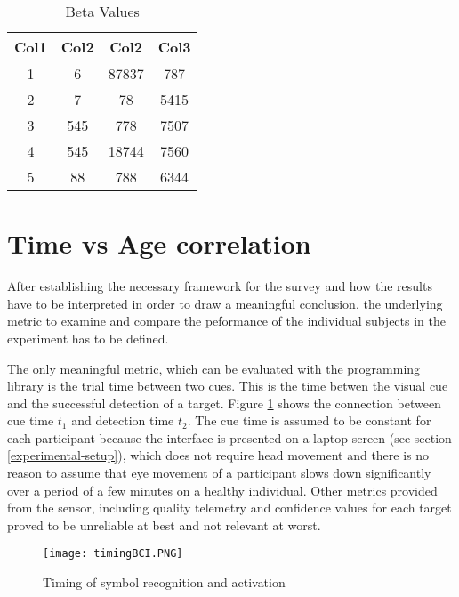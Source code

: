             \begin{table}[h!]
                \centering
                \begin{tabular}{||c c c c||} 
                 \hline
                 Col1 & Col2 & Col2 & Col3 \\ [0.5ex] 
                 \hline\hline
                 1 & 6 & 87837 & 787 \\ 
                 2 & 7 & 78 & 5415 \\
                 3 & 545 & 778 & 7507 \\
                 4 & 545 & 18744 & 7560 \\
                 5 & 88 & 788 & 6344 \\ [1ex] 
                 \hline
                \end{tabular}
                \caption{Beta Values}
                \label{beta}
            \end{table} 
                 
        \section{Time vs Age correlation}\label{correlation}

            After establishing the necessary framework for the survey and how the results have to be interpreted in order to draw a meaningful conclusion, the underlying metric to examine and compare the peformance of the individual subjects in the experiment has to be defined. 

            The only meaningful metric, which can be evaluated with the programming library is the trial time between two cues. This is the time betwen the visual cue and the successful detection of a target. Figure \ref*{itr-timing} shows the connection between cue time $t_{1}$ and detection time $t_{2}$. The cue time is assumed to be constant for each participant because the interface is presented on a laptop screen (see section \ref*{experimental-setup}), which does not require head movement and there is no reason to assume that eye movement of a participant slows down significantly over a period of a few minutes on a healthy individual. Other metrics provided from the sensor, including quality telemetry and confidence values for each target proved to be unreliable at best and not relevant at worst.

            \begin{figure}[h]     %
                \centering
                \texttt{[image: timingBCI.PNG]} 
                \caption{Timing of symbol recognition and activation }\label{itr-timing}
            \end{figure}


